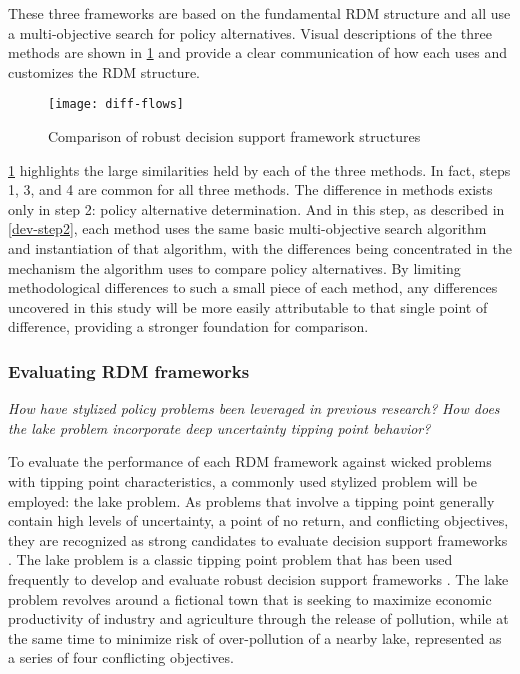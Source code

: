         These three frameworks are based on the fundamental RDM structure and all use a multi-objective search for policy alternatives. Visual descriptions of the three methods are shown in \cref{fig:diff-flows-conclusion} and provide a clear communication of how each uses and customizes the RDM structure. 
                
        \begin{figure}[h]
            \centering
            \captionsetup{justification=centering}
            
            \texttt{[image: diff-flows]}
            \caption{Comparison of robust decision support framework structures}
            \label{fig:diff-flows-conclusion}
        \end{figure}
    
        \cref{fig:diff-flows-conclusion} highlights the large similarities held by each of the three methods. In fact, steps 1, 3, and 4 are common for all three methods. The difference in methods exists only in step 2: policy alternative determination. And in this step, as described in \cref{dev-step2}, each method uses the same basic multi-objective search algorithm and instantiation of that algorithm, with the differences being concentrated in the mechanism the algorithm uses to compare policy alternatives. By limiting methodological differences to such a small piece of each method, any differences uncovered in this study will be more easily attributable to that single point of difference, providing a stronger foundation for comparison. 
                
        \subsubsection{Evaluating RDM frameworks}
        \textit{How have stylized policy problems been leveraged in previous research?} \newline
        \textit{How does the lake problem incorporate deep uncertainty tipping point behavior?}
        
        To evaluate the performance of each RDM framework against wicked problems with tipping point characteristics, a commonly used stylized problem will be employed: the lake problem. As problems that involve a tipping point generally contain high levels of uncertainty, a point of no return, and conflicting objectives, they are recognized as strong candidates to evaluate decision support frameworks \citep{Ward2015}. The lake problem is a classic tipping point problem that has been used frequently to develop and evaluate robust decision support frameworks \citep{Carpenter1999, Lempert2007, Quinn2017, Singh2015, Ward2015}. The lake problem revolves around a fictional town that is seeking to maximize economic productivity of industry and agriculture through the release of pollution, while at the same time to minimize risk of over-pollution of a nearby lake, represented as a series of four conflicting objectives. 
        
